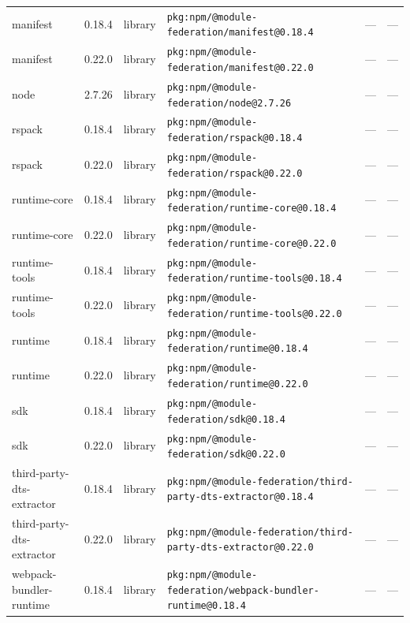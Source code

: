 \documentclass[11pt,a4paper]{article}
\begin{document}
\begin{longtable}{|p{4cm}|p{2cm}|p{1.6cm}|p{5cm}|p{1.5cm}|p{3.5cm}|}
\raggedright manifest & 0.18.4 & library & \small\texttt{pkg:npm/@module-federation/manifest@0.18.4} & — & \small — \\
\raggedright manifest & 0.22.0 & library & \small\texttt{pkg:npm/@module-federation/manifest@0.22.0} & — & \small — \\
\raggedright node & 2.7.26 & library & \small\texttt{pkg:npm/@module-federation/node@2.7.26} & — & \small — \\
\raggedright rspack & 0.18.4 & library & \small\texttt{pkg:npm/@module-federation/rspack@0.18.4} & — & \small — \\
\raggedright rspack & 0.22.0 & library & \small\texttt{pkg:npm/@module-federation/rspack@0.22.0} & — & \small — \\
\raggedright runtime-core & 0.18.4 & library & \small\texttt{pkg:npm/@module-federation/runtime-core@0.18.4} & — & \small — \\
\raggedright runtime-core & 0.22.0 & library & \small\texttt{pkg:npm/@module-federation/runtime-core@0.22.0} & — & \small — \\
\raggedright runtime-tools & 0.18.4 & library & \small\texttt{pkg:npm/@module-federation/runtime-tools@0.18.4} & — & \small — \\
\raggedright runtime-tools & 0.22.0 & library & \small\texttt{pkg:npm/@module-federation/runtime-tools@0.22.0} & — & \small — \\
\raggedright runtime & 0.18.4 & library & \small\texttt{pkg:npm/@module-federation/runtime@0.18.4} & — & \small — \\
\raggedright runtime & 0.22.0 & library & \small\texttt{pkg:npm/@module-federation/runtime@0.22.0} & — & \small — \\
\raggedright sdk & 0.18.4 & library & \small\texttt{pkg:npm/@module-federation/sdk@0.18.4} & — & \small — \\
\raggedright sdk & 0.22.0 & library & \small\texttt{pkg:npm/@module-federation/sdk@0.22.0} & — & \small — \\
\raggedright third-party-dts-extractor & 0.18.4 & library & \small\texttt{pkg:npm/@module-federation/third-party-dts-extractor@0.18.4} & — & \small — \\
\raggedright third-party-dts-extractor & 0.22.0 & library & \small\texttt{pkg:npm/@module-federation/third-party-dts-extractor@0.22.0} & — & \small — \\
\raggedright webpack-bundler-runtime & 0.18.4 & library & \small\texttt{pkg:npm/@module-federation/webpack-bundler-runtime@0.18.4} & — & \small — \\

\end{longtable}
\end{document}
